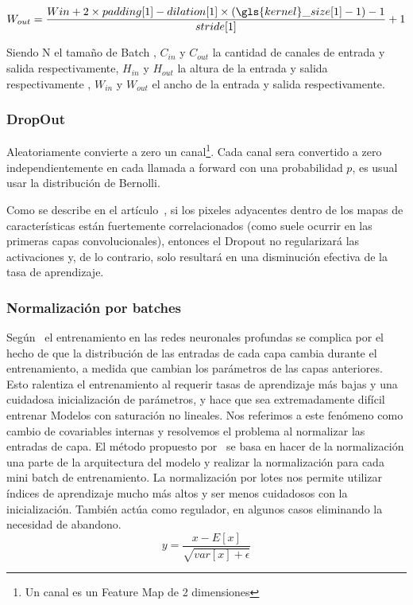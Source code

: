         \begin{equation}
            W_{out} = \frac{W{in}+2\times padding[1]-dilation[1]  \times (\gls{kernel}\_size[1]-1)-1}{stride[1]} +1
        \end{equation}
        
    Siendo N el tamaño de \gls{Batch} , $C_{in}$ y $C_{out}$ la cantidad de canales de entrada y salida respectivamente, $H_{in}$ y $H_{out}$ la altura de la entrada y salida respectivamente , $W_{in}$ y $W_{out}$ el ancho de la entrada y salida respectivamente.



    
\subsubsection{DropOut}

Aleatoriamente convierte a zero un canal\footnote{ Un canal es un \gls{Feature Map} de 2 dimensiones}. Cada canal sera convertido a zero independientemente en cada llamada a forward con una probabilidad $p$, es usual usar la distribución de Bernolli. 

Como se describe en el artículo~\cite{Tompson2014}, si los pixeles adyacentes dentro de los mapas de características están fuertemente correlacionados (como suele ocurrir en las primeras capas convolucionales), entonces el Dropout no regularizará las activaciones y, de lo contrario, solo resultará en una disminución efectiva de la tasa de aprendizaje.


\subsubsection{Normalización por batches}
 Según~\cite{Ioffe2015} el entrenamiento en las redes neuronales profundas se complica por el hecho de que la distribución de las entradas de cada capa cambia durante el entrenamiento, a medida que cambian los parámetros de las capas anteriores. Esto ralentiza el entrenamiento al requerir tasas de aprendizaje más bajas y una cuidadosa inicialización de parámetros, y hace que sea extremadamente difícil entrenar Modelos con saturación no lineales. Nos referimos a este fenómeno como cambio de covariables internas y resolvemos el problema al normalizar las entradas de capa. El método propuesto por~\cite{Ioffe2015} se basa en hacer de la normalización una parte de la arquitectura del modelo y realizar la normalización para cada mini batch de entrenamiento. La normalización por lotes nos permite utilizar índices de aprendizaje mucho más altos y ser menos cuidadosos con la inicialización. También actúa como regulador, en algunos casos eliminando la necesidad de abandono. 
 \begin{equation}
     y = \frac{x-E[x]}{\sqrt{var[x]+\epsilon}}
 \end{equation}

